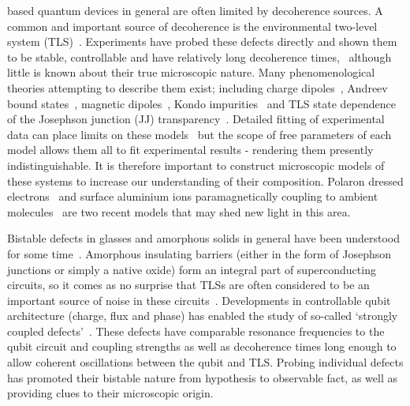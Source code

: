 based quantum devices in general are often limited by decoherence sources.
A common and important source of decoherence is the environmental two-level system (TLS)~\cite{Dutta1981, Shnirman2005}.
Experiments have probed these defects directly and shown them to be stable, controllable and have relatively long decoherence times,~\cite{Simmonds2004, Neeley2008, Shalibo2010, Lupascu2009, Lisenfeld2010, Gunnarsson2013} although little is known about their true microscopic nature.
Many phenomenological theories attempting to describe them exist; including charge dipoles~\cite{Martinis2005}, Andreev bound states~\cite{deSousa2009}, magnetic dipoles~\cite{Sendelbach2008}, Kondo impurities~\cite{Faoro2007} and TLS state dependence of the Josephson junction (JJ) transparency~\cite{Ku2005}.
Detailed fitting of experimental data can place limits on these models~\cite{Cole2010} but the scope of free parameters of each model allows them all to fit experimental results - rendering them presently indistinguishable.
It is therefore important to construct microscopic models of these systems to increase our understanding of their composition.
Polaron dressed electrons~\cite{Agarwal2013} and surface aluminium ions paramagnetically coupling to ambient molecules~\cite{Lee2014} are two recent models that may shed new light in this area.

Bistable defects in glasses and amorphous solids in general have been understood for some time~\cite{Anderson1972}.
Amorphous insulating barriers (either in the form of Josephson junctions or simply a native oxide) form an integral part of superconducting circuits, so it comes as no surprise that TLSs are often considered to be an important source of noise in these circuits~\cite{Dutta1981, Shnirman2005, Martinis2005}.
Developments in controllable qubit architecture (charge, flux and phase) has enabled the study of so-called `strongly coupled defects'~\cite{Neeley2008, Lupascu2009, Lisenfeld2010}.
These defects have comparable resonance frequencies to the qubit circuit and coupling strengths as well as decoherence times long enough to allow coherent oscillations between the qubit and TLS.
Probing individual defects has promoted their bistable nature from hypothesis to observable fact, as well as providing clues to their microscopic origin.

